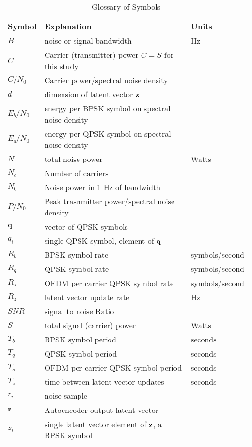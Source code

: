 \documentclass{article}
\begin{document}
\begin{table} [H]
\centering
\begin{tabular}{l l l}
 \hline
 Symbol & Explanation & Units \\
 \hline
 $B$ & noise or signal bandwidth & Hz \\
 $C$ & Carrier (transmitter) power $C=S$ for this study \\
 $C/N_0$ & Carrier power/spectral noise density \\
 $d$ & dimension of latent vector $\bf{z}$ \\
 $E_b/N_0$ & energy per BPSK symbol on spectral noise density \\
 $E_q/N_0$ & energy per QPSK symbol on spectral noise density \\
 $N$ & total noise power & Watts \\
 $N_c$ & Number of carriers  \\
 $N_0$ & Noise power in 1 Hz of bandwidth  \\
 $P/N_0$ & Peak trasnmitter power/spectral noise density \\
 $\bf{q}$ & vector of QPSK symbols \\ 
 $q_i$ & single QPSK symbol, element of $\bf{q}$ \\ 
 $R_b$ & BPSK symbol rate & symbols/second \\
 $R_q$ & QPSK symbol rate & symbols/second \\
 $R_s$ & OFDM per carrier QPSK symbol rate & symbols/second \\
 $R_z$ & latent vector update rate & Hz \\
 $SNR$ & signal to noise Ratio \\
 $S$ & total signal (carrier) power & Watts \\
 $T_b$ & BPSK symbol period & seconds \\
 $T_q$ & QPSK symbol period & seconds \\
 $T_s$ & OFDM per carrier QPSK symbol period & seconds\\
 $T_z$ & time between latent vector updates & seconds\\
 $r_i$ & noise sample \\
 $\bf{z}$ & Autoencoder output latent vector \\ 
 $z_i$ & single latent vector element of $\bf{z}$, a BPSK symbol \\ 
 \hline
\end{tabular}
\caption{Glossary of Symbols}
\end{table}

\nocite{*}


\end{document}

